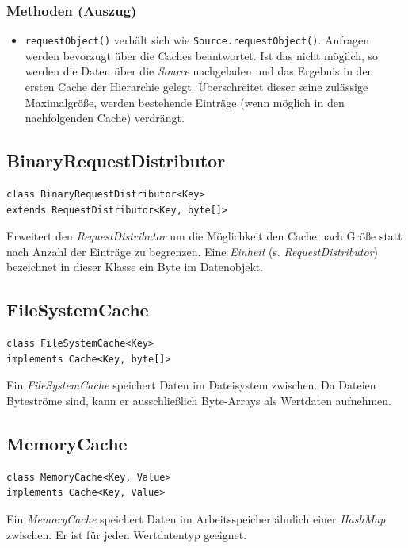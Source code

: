 \documentclass[10pt]{scrreprt}
\begin{document}
\subsubsection*{Methoden (Auszug)}
\begin{itemize}
\item \texttt{requestObject()} verhält sich wie \texttt{Source.requestObject()}. Anfragen werden bevorzugt über die Caches beantwortet. Ist das nicht mögilch, so werden die Daten über die \textit{Source} nachgeladen und das Ergebnis in den ersten Cache der Hierarchie gelegt. Überschreitet dieser seine zulässige Maximalgröße, werden bestehende Einträge (wenn möglich in den nachfolgenden Cache) verdrängt. 
\end{itemize}
\vspace{5mm}
\subsection*{BinaryRequestDistributor}
\begin{lstlisting}
class BinaryRequestDistributor<Key>
extends RequestDistributor<Key, byte[]>
\end{lstlisting}
Erweitert den \textit{RequestDistributor} um die Möglichkeit den Cache nach Größe statt nach Anzahl der Einträge zu begrenzen. Eine \textit{Einheit} (s. \textit{RequestDistributor}) bezeichnet in dieser Klasse ein Byte im Datenobjekt.
\pagebreak
\subsection*{FileSystemCache}
\begin{lstlisting}
class FileSystemCache<Key>
implements Cache<Key, byte[]>
\end{lstlisting}
Ein \textit{FileSystemCache} speichert Daten im Dateisystem zwischen. Da Dateien Byteströme sind, kann er ausschließlich Byte-Arrays als Wertdaten aufnehmen.\\

\vspace{5mm}
\subsection*{MemoryCache}
\begin{lstlisting}
class MemoryCache<Key, Value>
implements Cache<Key, Value>
\end{lstlisting}
Ein \textit{MemoryCache} speichert Daten im Arbeitsspeicher ähnlich einer \textit{HashMap} zwischen. Er ist für jeden Wertdatentyp geeignet.\\
\end{document}
